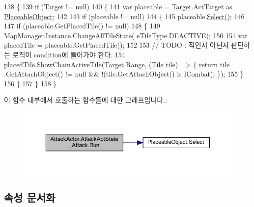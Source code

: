 \begin{DoxyCode}
138         \{
139             \textcolor{keywordflow}{if} (\hyperlink{class_m_c_n_1_1_state_a93ba2fd920292031bd6e65b1dc505cb3}{Target} != null)
140             \{
141                 var placeable = \hyperlink{class_m_c_n_1_1_state_a93ba2fd920292031bd6e65b1dc505cb3}{Target}.ActTarget as \hyperlink{class_placeable_object}{PlaceableObject};
142 
143                 \textcolor{keywordflow}{if} (placeable != null)
144                 \{
145                     placeable.\hyperlink{class_placeable_object_a019818f3f6c6eb715fed163efa921f5a}{Select}();
146 
147                     \textcolor{keywordflow}{if} (placeable.GetPlacedTile() != null)
148                     \{
149                         \hyperlink{class_map_manager}{MapManager}.\hyperlink{class_m_c_n_1_1_mono_singletone_aa50c027cca64cf4ad30c1ee5c83e0b78}{Instance}.ChangeAllTileState(
      \hyperlink{_tile_8cs_a271bc07be325bca511bcb747e0ff2fda}{eTileType}.DEACTIVE);
150 
151                         var placedTile = placeable.GetPlacedTile();
152                         
153                         \textcolor{comment}{// TODO : 적인지 아닌지 판단하는 로직이 condition에 들어가야 한다.}
154                         placedTile.ShowChainActiveTile(\hyperlink{class_m_c_n_1_1_state_a93ba2fd920292031bd6e65b1dc505cb3}{Target}.Range, (\hyperlink{class_tile}{Tile} tile) => \{ return tile
      .GetAttachObject() != null && !(tile.GetAttachObject() is ICombat); \});
155                     \}
156                 \}
157             \}
158         \}
\end{DoxyCode}


이 함수 내부에서 호출하는 함수들에 대한 그래프입니다.\+:
\nopagebreak
\begin{figure}[H]
\begin{center}
\leavevmode
\includegraphics[width=350pt]{class_attack_actor_1_1_attack_act_state___attack_a2755f4dae2cf1f80a94b6bcc973d1bfd_cgraph}
\end{center}
\end{figure}




\subsection{속성 문서화}
